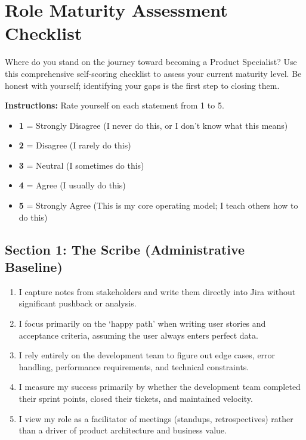 \documentclass[
  11pt,
  openany,
  oneside]{book}
\providecommand{\tightlist}{%
  \setlength{\itemsep}{0pt}\setlength{\parskip}{0pt}}
\begin{document}
\section{Role Maturity Assessment
Checklist}\label{role-maturity-assessment-checklist}

Where do you stand on the journey toward becoming a Product Specialist?
Use this comprehensive self-scoring checklist to assess your current
maturity level. Be honest with yourself; identifying your gaps is the
first step to closing them.

\textbf{Instructions:} Rate yourself on each statement from 1 to 5.

\begin{itemize}
\tightlist
\item
  \textbf{1} = Strongly Disagree (I never do this, or I don't know what
  this means)
\item
  \textbf{2} = Disagree (I rarely do this)
\item
  \textbf{3} = Neutral (I sometimes do this)
\item
  \textbf{4} = Agree (I usually do this)
\item
  \textbf{5} = Strongly Agree (This is my core operating model; I teach
  others how to do this)
\end{itemize}

\subsection{Section 1: The Scribe (Administrative
Baseline)}\label{section-1-the-scribe-administrative-baseline}

\begin{enumerate}
\def\labelenumi{\arabic{enumi}.}
\tightlist
\item
  I capture notes from stakeholders and write them directly into Jira
  without significant pushback or analysis.
\item
  I focus primarily on the `happy path' when writing user stories and
  acceptance criteria, assuming the user always enters perfect data.
\item
  I rely entirely on the development team to figure out edge cases,
  error handling, performance requirements, and technical constraints.
\item
  I measure my success primarily by whether the development team
  completed their sprint points, closed their tickets, and maintained
  velocity.
\item
  I view my role as a facilitator of meetings (standups, retrospectives)
  rather than a driver of product architecture and business value.
\end{enumerate}
\end{document}
